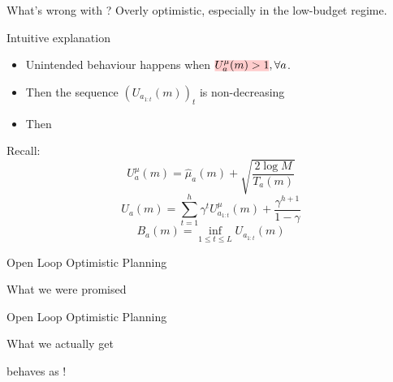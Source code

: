 \documentclass{beamer}
\begin{document}
\begin{frame}{What's wrong with \OLOP?}
    Overly optimistic, especially in the low-budget regime.

    \begin{alertblock}{Intuitive explanation}
    \begin{itemize}
        \item Unintended behaviour happens when $\hler{U^{\mu}_a(m) > 1}, \forall a$. 
        \item Then the sequence $(U_{a_{1:t}}(m))_t$ is non-decreasing
        \item Then 
    \end{itemize}
    \end{alertblock}
    
    Recall:
    \begin{equation*}
         U^{\mu}_a(m) = \hat{\mu}_a(m) + \sqrt{\frac{2 \log M}{T_a(m)}}
    \end{equation*}
    \begin{equation*}
    \label{eq:Ua}
        U_a(m) = \sum_{t=1}^h \gamma^t U^{\mu}_{a_{1:t}}(m) + \frac{\gamma^{h+1}}{1-\gamma}
    \end{equation*}
    \begin{equation*}
    \label{eq:Ba}
        B_a(m) = \inf_{1 \leq t \leq L} U_{a_{1:t}}(m)
    \end{equation*}
\end{frame}

\begin{frame}{Open Loop Optimistic Planning}
\begin{block}{What we were promised}
\begin{center}

\end{center}
\end{block}
\end{frame}

\begin{frame}{Open Loop Optimistic Planning}
\begin{block}{What we actually get}
\begin{center}

\end{center}
\end{block}
\begin{flushright}
\OLOP behaves as !
\end{flushright}
\end{frame}
\end{document}
